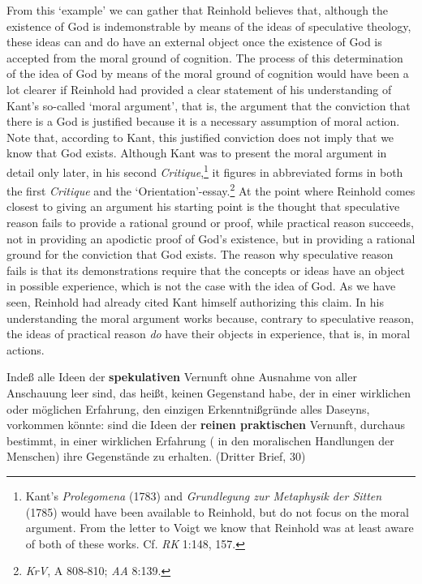From this `example' we can gather that Reinhold believes that, although the existence of God is indemonstrable by means of the ideas of speculative theology, these ideas can and do have an external object once the existence of God is accepted from the moral ground of cognition. The process of this determination of the idea of God by means of the moral ground of cognition would have been a lot clearer if Reinhold had provided a clear statement of his understanding of Kant's so{-}called `moral argument', that is, the argument that the conviction that there is a God is justified because it is a necessary assumption of moral action. Note that, according to Kant, this justified conviction does not imply that we know that God exists. Although Kant was to present the moral argument in detail only later, in his second \textit{Critique},\footnote{ Kant's \textit{Prolegomena }(1783) and \textit{Grundlegung zur Metaphysik der Sitten} (1785) would have been available to Reinhold, but do not focus on the moral argument. From the letter to Voigt we know that Reinhold was at least aware of both of these works. Cf. \textit{RK} 1:148, 157. } it figures in abbreviated forms in both the first \textit{Critique }and the `Orientation'{-}essay.\footnote{ \textit{KrV}, A 808{-}810; \textit{AA} 8:139. } At the point where Reinhold comes closest to giving an argument his starting point is the thought that speculative reason fails to provide a rational ground or proof, while practical reason succeeds, not in providing an apodictic proof of God's existence, but in providing a rational ground for the conviction that God exists. The reason why speculative reason fails is that its demonstrations require that the concepts or ideas have an object in possible experience, which is not the case with the idea of God. As we have seen, Reinhold had already cited Kant himself authorizing this claim. In his understanding the moral argument works because, contrary to speculative reason, the ideas of practical reason \textit{do} have their objects in experience, that is, in moral actions.

Inde\ss{} alle Ideen der \textbf{spekulativen} Vernunft ohne Ausnahme von aller Anschauung leer sind, das hei\ss{}t, keinen Gegenstand habe, der in einer wirklichen oder m\"{o}glichen Erfahrung, den einzigen Erkenntni\ss{}gr\"{u}nde alles Daseyns, vorkommen k\"{o}nnte: sind die Ideen der \textbf{reinen praktischen }Vernunft, durchaus bestimmt, in einer wirklichen Erfahrung ( in den moralischen Handlungen der Menschen) ihre Gegenst\"{a}nde zu erhalten. (Dritter Brief, 30)

